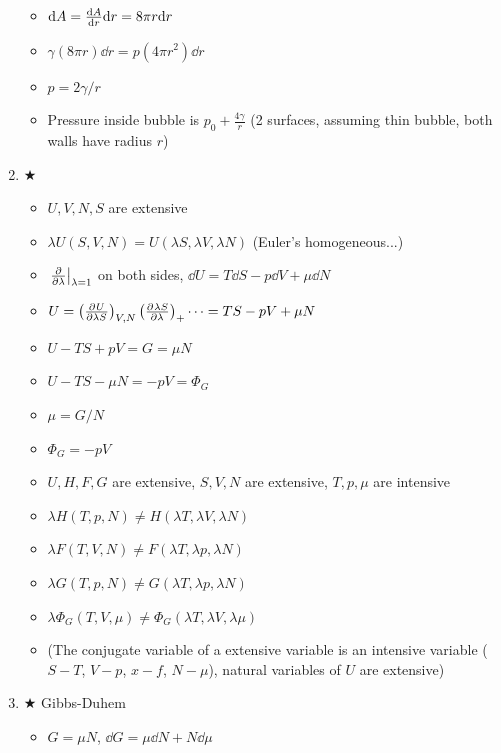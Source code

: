 \documentclass{article}
\theoremstyle{remark}
\newcommand{\myref}[1]{\hyperref[back:#1]{$\bigstar$}\label{#1}}
\newcommand{\ppdv}[4][]{\left(\pdv[#1]{#2}{#3}\right)_{#4}}
\begin{document}
\begin{enumerate}
\begin{minipage}{0.4\linewidth}
\begin{itemize}
                \item $\dd A=\dv{A}{r}\dd r=8\pi r\dd r$
                \item $\gamma (8\pi r)\dd r=p(4\pi r^2)\dd r$
                \item $p = 2\gamma/r$
                \item Pressure inside bubble is $p_0+\frac{4\gamma}{r}$ (2 surfaces, assuming thin bubble, both walls have radius $r$)
            \end{itemize}
        \end{minipage}
    \item \myref{mu_and_G}\begin{itemize}
            \item $U,V,N,S$ are extensive
            \item $\lambda U(S,V,N) = U(\lambda S,\lambda V,\lambda N)$ (Euler's homogeneous...)
            \item $\eval{\pdv{\lambda}}_{\lambda=1}$ on both sides, $\dd U=T\dd S-p\dd V+\mu\dd N$
            \item $U=\ppdv{U}{\lambda S}{V,N}\ppdv{\lambda S}{\lambda}+\cdots=TS-pV+\mu N$
            \item $U-TS+pV = G = \mu N$
            \item $U-TS-\mu N=-pV=\Phi_G$
            \item $\boxed{\mu=G/N}$
            \item $\boxed{\Phi_G=-pV}$
            \item $U,H,F,G$ are extensive, $S,V,N$ are extensive, $T,p,\mu$ are intensive
            \item $\lambda H(T,p,N)\neq H(\lambda T,\lambda V,\lambda N)$
            \item $\lambda F(T,V,N)\neq F(\lambda T,\lambda p,\lambda N)$
            \item $\lambda G(T,p,N)\neq G(\lambda T,\lambda p,\lambda N)$
            \item $\lambda \Phi_G(T,V,\mu)\neq\Phi_G(\lambda T,\lambda V,\lambda\mu)$
            \item (The conjugate variable of a extensive variable is an intensive variable ($S-T$, $V-p$, $x-f$, $N-\mu$), natural variables of $U$ are extensive)
        \end{itemize}
    \item \myref{gibbs_duhem} Gibbs-Duhem\begin{itemize}
            \item $G=\mu N$, $\dd G=\mu\dd N+N\dd\mu$

\end{itemize}
\end{enumerate}
\end{document}
